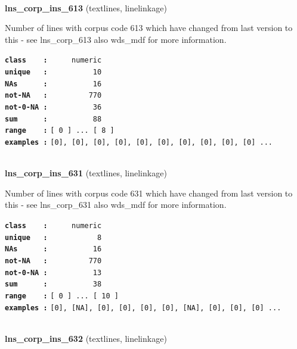 \documentclass[]{article}
\begin{document}
~

\textbf{lns\_corp\_ins\_613} (textlines, linelinkage)

Number of lines with corpus code 613 which have changed from last
version to this - see lns\_corp\_613 also wds\_mdf for more information.

\textbf{\texttt{class\ \ \ \ :}} \texttt{~~~~~numeric}\\
\textbf{\texttt{unique\ \ \ :}} \texttt{~~~~~~~~~~10}\\
\textbf{\texttt{NAs\ \ \ \ \ \ :}} \texttt{~~~~~~~~~~16}\\
\textbf{\texttt{not-NA\ \ \ :}} \texttt{~~~~~~~~~770}\\
\textbf{\texttt{not-0-NA\ :}} \texttt{~~~~~~~~~~36}\\
\textbf{\texttt{sum\ \ \ \ \ \ :}} \texttt{~~~~~~~~~~88}\\
\textbf{\texttt{range\ \ \ \ :}}
\texttt{{[}\ 0\ {]}\ ...\ {[}\ 8\ {]}}\\
\textbf{\texttt{examples\ :}}
\texttt{{[}0{]},\ {[}0{]},\ {[}0{]},\ {[}0{]},\ {[}0{]},\ {[}0{]},\ {[}0{]},\ {[}0{]},\ {[}0{]},\ {[}0{]}\ ...}\\

~

\textbf{lns\_corp\_ins\_631} (textlines, linelinkage)

Number of lines with corpus code 631 which have changed from last
version to this - see lns\_corp\_631 also wds\_mdf for more information.

\textbf{\texttt{class\ \ \ \ :}} \texttt{~~~~~numeric}\\
\textbf{\texttt{unique\ \ \ :}} \texttt{~~~~~~~~~~~8}\\
\textbf{\texttt{NAs\ \ \ \ \ \ :}} \texttt{~~~~~~~~~~16}\\
\textbf{\texttt{not-NA\ \ \ :}} \texttt{~~~~~~~~~770}\\
\textbf{\texttt{not-0-NA\ :}} \texttt{~~~~~~~~~~13}\\
\textbf{\texttt{sum\ \ \ \ \ \ :}} \texttt{~~~~~~~~~~38}\\
\textbf{\texttt{range\ \ \ \ :}}
\texttt{{[}\ 0\ {]}\ ...\ {[}\ 10\ {]}}\\
\textbf{\texttt{examples\ :}}
\texttt{{[}0{]},\ {[}NA{]},\ {[}0{]},\ {[}0{]},\ {[}0{]},\ {[}0{]},\ {[}NA{]},\ {[}0{]},\ {[}0{]},\ {[}0{]}\ ...}\\

~

\textbf{lns\_corp\_ins\_632} (textlines, linelinkage)
\end{document}
